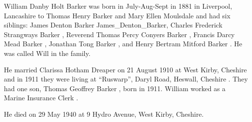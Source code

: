 
William Danby Holt Barker was born in July-Aug-Sept in 1881 \cite{WDHBarkerBirth} in Liverpool, Lancashire to Thomas Henry Barker  and Mary Ellen Moulsdale   and had six siblings: James Denton Barker {James_Denton_Barker},  Charles Frederick Strangways Barker , Reverend Thomas Percy Conyers Barker , Francis Darcy Mead Barker , Jonathan Tong Barker , and Henry Bertram Mitford Barker . He was called Will in the family.

He married Clarissa Hotham Dreaper  on 21 August 1910 at West Kirby, Cheshire\cite{CheshireParishRegisters} and in 1911 they were living at ``Ruswarp'', Daryl Road, Heswall, Cheshire \cite{WDHBarker1911}.  They had one son, Thomas Geoffrey Barker , born in 1911. William worked as a Marine Insurance Clerk \cite{WDHBarker1911}.

He died on 29 May 1940 at 9 Hydro Avenue, West Kirby, Cheshire.
